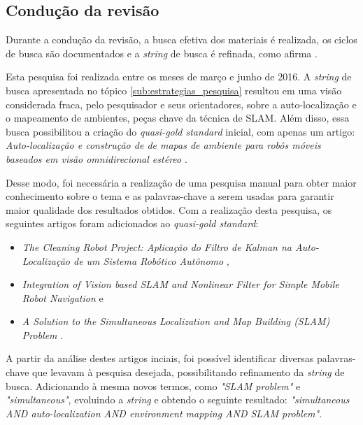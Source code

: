 
	\subsection{Condução da revisão} %
	\label{sub:conducaoRevisao}

		Durante a condução da revisão, a busca efetiva dos materiais é realizada, os ciclos de busca são documentados e a \textit{string} de busca é refinada, como afirma \cite{estudoPrimarioSecundario}.

		Esta pesquisa foi realizada entre os meses de março e junho de 2016. A \textit{string} de busca apresentada no tópico \ref{sub:estrategias_pesquisa} resultou em uma visão considerada fraca, pelo pesquisador e seus orientadores, sobre a auto-localização e o mapeamento de ambientes, peças chave da técnica de SLAM. Além disso, essa busca possibilitou a criação do \textit{quasi-gold standard} inicial, com apenas um artigo: \textit{Auto-localização e construção de de mapas de ambiente para robôs móveis baseados em visão omnidirecional estéreo} \cite{localizacaoEMapeamentoPaulo}.

		Desse modo, foi necessária a realização de uma pesquisa manual para obter maior conhecimento sobre o tema e as palavras-chave a serem usadas para garantir maior qualidade dos resultados obtidos. Com a realização desta pesquisa, os seguintes artigos foram adicionados ao \textit{quasi-gold standard}:

		\begin{itemize}
			\item \textit{The Cleaning Robot Project: Aplicação do Filtro de Kalman na Auto-Localização de um Sistema Robótico Autônomo} \cite{theCleaningProject},
			\item \textit{Integration of Vision based SLAM and Nonlinear Filter for Simple Mobile Robot Navigation} \cite{integrationVisionSLAMnonlinear} e
			\item \textit{A Solution to the Simultaneous Localization and Map Building (SLAM) Problem} \cite{slamProblem}.
		\end{itemize}

		A partir da análise destes artigos inciais, foi possível identificar diversas palavras-chave que levavam à pesquisa desejada, possibilitando refinamento da \textit{string} de busca. Adicionando à mesma novos termos, como \textit{"SLAM problem"} e \textit{"simultaneous"}, evoluindo a \textit{string} e obtendo o seguinte resultado: \textit{"simultaneous AND auto-localization AND environment mapping AND SLAM problem"}.

